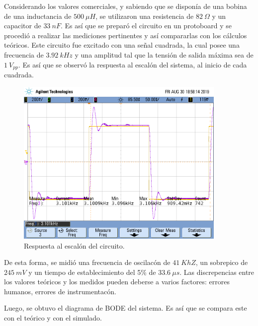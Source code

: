 Considerando los valores comerciales, y sabiendo que se disponía de una bobina de una inductancia de $500 \ \mu H$, se utilizaron una resistencia de $82 \ \Omega$ y un capacitor de $33 \ nF$. Es así que se preparó el circuito en un protoboard y se procedió a realizar las mediciones pertinentes y así compararlas con los cálculos teóricos. Este circuito fue excitado con una señal cuadrada, la cual posee una frecuencia de $3.92 \ kHz$ y una amplitud tal que la tensión de salida máxima sea de $1 \ V_{pp}$. Es así que se observó la respuesta al escalón del sistema, al inicio de cada cuadrada.

\begin{figure}[H]
	\centering
	\includegraphics[width=0.9\textwidth, trim = {0 3.4cm 0.4cm 2cm},clip]{Ejercicio2/Mediciones/A/scope_0.png}
\caption{Respuesta al escalón del circuito.}
	\label{fig:rtaescalon}
\end{figure}

De esta forma, se midió una frecuencia de oscilacón de $41 \ KhZ $, un sobrepico de $245 \ mV$ y un tiempo de establecimiento del 5\% de $33.6 \ \mu s$. Las discrepencias entre los valores teóricos y los medidos pueden deberse a varios factores: errores humanos, errores de instrumentacón.

Luego, se obtuvo el diagrama de BODE del sistema. Es así que se compara este con el teórico y con el simulado.


